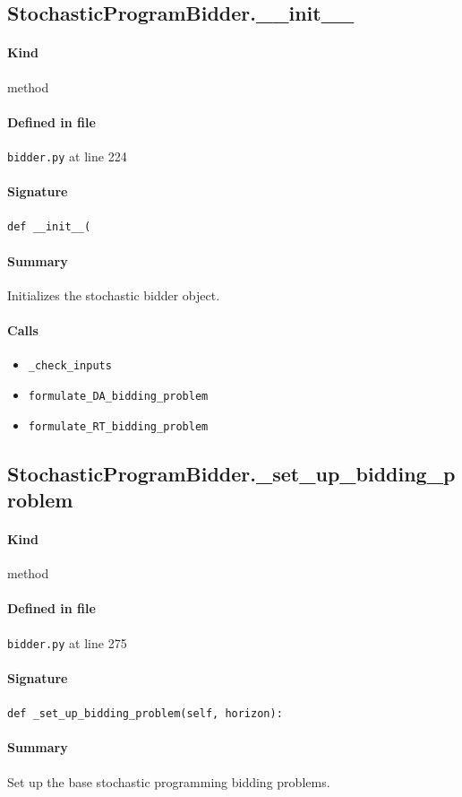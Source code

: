 \documentclass[11pt]{report}
\begin{document}
\subsection{StochasticProgramBidder.\_\_init\_\_}
\label{def:bidder.py:StochasticProgramBidder.__init__:L224}
\paragraph{Kind} method
\paragraph{Defined in file} \texttt{bidder.py} at line 224
\paragraph{Signature} \texttt{def \_\_init\_\_(}
\paragraph{Summary} Initializes the stochastic bidder object.
\paragraph{Calls}
\begin{itemize}[leftmargin=*]
  \item \texttt{\_check\_inputs}
  \item \texttt{formulate\_DA\_bidding\_problem}
  \item \texttt{formulate\_RT\_bidding\_problem}
\end{itemize}
\subsection{StochasticProgramBidder.\_set\_up\_bidding\_problem}
\label{def:bidder.py:StochasticProgramBidder._set_up_bidding_problem:L275}
\paragraph{Kind} method
\paragraph{Defined in file} \texttt{bidder.py} at line 275
\paragraph{Signature} \texttt{def \_set\_up\_bidding\_problem(self, horizon):}
\paragraph{Summary} Set up the base stochastic programming bidding problems.
\end{document}
